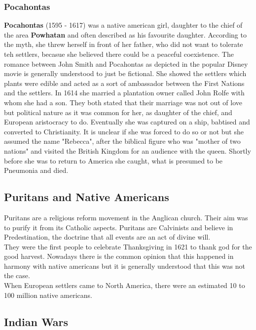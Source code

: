 \documentclass{article}
\begin{document}
	\subsubsection{Pocahontas}
	\textbf{Pocahontas} (1595 - 1617) was a native american girl, daughter to the chief of the area \textbf{Powhatan} and often described as his favourite daughter. According to the myth, she threw herself in front of her father, who did not want to tolerate teh settlers, becasue she believed there could be a peaceful coexistence. The romance between John Smith and Pocahontas as depicted in the popular Disney movie is generally understood to just be fictional. She showed the settlers which plants were edible and acted as a sort of ambassador between the First Nations and the settlers. In 1614 she married a plantation owner called John Rolfe with whom she had a son. They both stated that their marriage was not out of love but political nature as it was common for her, as daughter of the chief, and European aristocracy to do. Eventually she was captured on a ship, babtised and converted to Christianity. It is unclear if she was forced to do so or not but she assumed the name "Rebecca", after the biblical figure who was "mother of two nations" and visited the British Kingdom for an audience with the queen. Shortly before she was to return to America she caught, what is presumed to be Pneumonia and died. \\
	\subsection{Puritans and Native Americans}
	Puritans are a religious reform movement in the Anglican church. Their aim was to purify it from its Catholic aspects. Puritans are Calvinists and believe in Predestination, the doctrine that all events are an act of divine will. \\
	They were the first people to celebrate Thanksgiving in 1621 to thank god for the good harvest. Nowadays there is the common opinion that this happened in harmony with native americans but it is generally understood that this was not the case. \\
	When European settlers came to North America, there were an estimated 10 to 100 million native americans. \\
	\subsection{Indian Wars}
	
	
\end{document}
